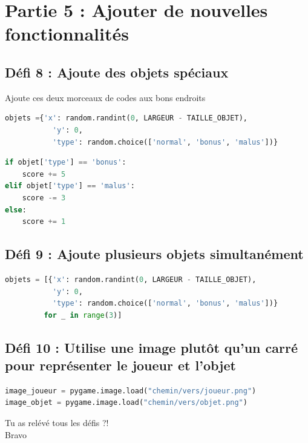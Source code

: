 \vspace{0.8cm}
\section*{Partie 5 : Ajouter de nouvelles fonctionnalités}

\subsection*{Défi 8 : Ajoute des objets spéciaux}
Ajoute ces deux morceaux de codes aux bons endroits
\begin{lstlisting}[style=pythonstyle, language=python]
objets ={'x': random.randint(0, LARGEUR - TAILLE_OBJET),
           'y': 0,
           'type': random.choice(['normal', 'bonus', 'malus'])}
\end{lstlisting}
\begin{lstlisting}[style=pythonstyle, language=python]
if objet['type'] == 'bonus':
    score += 5
elif objet['type'] == 'malus':
    score -= 3
else:
    score += 1
\end{lstlisting}

\subsection*{Défi 9 : Ajoute plusieurs objets simultanément}

\begin{lstlisting}[style=pythonstyle, language=python]
objets = [{'x': random.randint(0, LARGEUR - TAILLE_OBJET),
           'y': 0,
           'type': random.choice(['normal', 'bonus', 'malus'])}
         for _ in range(3)]
\end{lstlisting}

\subsection*{Défi 10 : Utilise une image plutôt qu'un carré pour représenter le joueur et l'objet}
\begin{lstlisting}[style=pythonstyle, language=python]
image_joueur = pygame.image.load("chemin/vers/joueur.png")
image_objet = pygame.image.load("chemin/vers/objet.png")
\end{lstlisting}

\vspace{1cm}
\begin{center}
    \huge{ Tu as relévé tous les défis ?!}\\
    \huge{Bravo }
\end{center}

